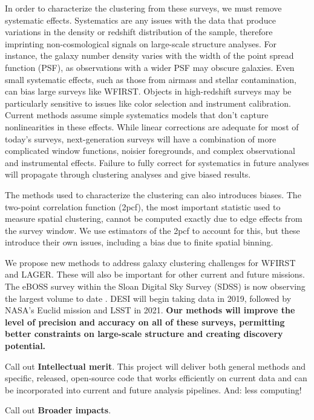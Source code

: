 \documentclass[12pt, fullpage, letterpaper]{article}
\newcommand{\cf}{2pcf\xspace}
\begin{document}
In order to characterize the clustering from these surveys, we must remove systematic effects.
Systematics are any issues with the data that produce variations in the density or redshift distribution of the sample, therefore imprinting non-cosmological signals on large-scale structure analyses.
For instance, the galaxy number density varies with the width of the point spread function (PSF), as observations with a wider PSF may obscure galaxies.
Even small systematic effects, such as those from airmass and stellar contamination, can bias large surveys like WFIRST. 
Objects in high-redshift surveys may be particularly sensitive to issues like color selection and instrument calibration.
Current methods assume simple systematics models that don't capture nonlinearities in these effects.
While linear corrections are adequate for most of today's surveys, next-generation surveys will have a combination of more complicated window functions, noisier foregrounds, and complex observational and instrumental effects.
Failure to fully correct for systematics in future analyses will propagate through clustering analyses and give biased results.

The methods used to characterize the clustering can also introduces biases.
The two-point correlation function (\cf), the most important statistic used to measure spatial clustering, cannot be computed exactly due to edge effects from the survey window.
We use estimators of the \cf to account for this, but these introduce their own issues, including a bias due to finite spatial binning.

We propose new methods to address galaxy clustering challenges for WFIRST and LAGER.
These will also be important for other current and future missions.
The eBOSS survey within the Sloan Digital Sky Survey (SDSS) is now observing the largest volume to date \citep{Dawson2015}. 
DESI \citep{Aghamousa2016} will begin taking data in 2019, followed by NASA's Euclid mission \citep{Amiaux2012} and LSST \citep{Ivezic2018} in 2021.
\textbf{Our methods will improve the level of precision and accuracy on all of these surveys, permitting better constraints on large-scale structure and creating discovery potential.}

Call out \textbf{Intellectual merit}.
This project will deliver both general methods and specific, released,
open-source code that works efficiently on current data and can be
incorporated into current and future analysis pipelines. And: less computing!

Call out \textbf{Broader impacts}.
\end{document}
